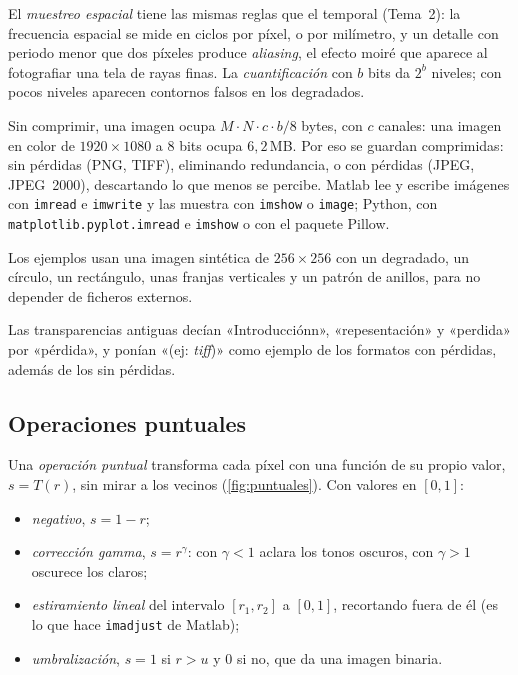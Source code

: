 \documentclass[11pt,a4paper]{scrartcl}
\begin{document}
El \emph{muestreo espacial} tiene las mismas reglas que el temporal (Tema~2): la frecuencia espacial se mide en ciclos por píxel, o por milímetro, y un detalle con periodo menor que dos píxeles produce \emph{aliasing}, el efecto moiré que aparece al fotografiar una tela de rayas finas. La \emph{cuantificación} con $b$ bits da $2^b$ niveles; con pocos niveles aparecen contornos falsos en los degradados.

Sin comprimir, una imagen ocupa $M\cdot N\cdot c\cdot b/8$ bytes, con $c$ canales: una imagen en color de $1920\times1080$ a 8 bits ocupa $6{,}2$\,MB. Por eso se guardan comprimidas: sin pérdidas (PNG, TIFF), eliminando redundancia, o con pérdidas (JPEG, JPEG~2000), descartando lo que menos se percibe. Matlab lee y escribe imágenes con \texttt{imread} e \texttt{imwrite} y las muestra con \texttt{imshow} o \texttt{image}; Python, con \texttt{matplotlib.pyplot.imread} e \texttt{imshow} o con el paquete Pillow.

\begin{encodigo}
  Los ejemplos usan una imagen sintética de $256\times256$ con un degradado, un círculo, un rectángulo, unas franjas verticales y un patrón de anillos, para no depender de ficheros externos.
\end{encodigo}

\begin{errata}
  Las transparencias antiguas decían «Introducciónn», «repesentación» y «perdida» por «pérdida», y ponían «(ej: \emph{tiff})» como ejemplo de los formatos con pérdidas, además de los sin pérdidas.
\end{errata}

\subsection{Operaciones puntuales}

Una \emph{operación puntual} transforma cada píxel con una función de su propio valor, $s=T(r)$, sin mirar a los vecinos (\cref{fig:puntuales}). Con valores en $[0,1]$:
\begin{itemize}
  \item \emph{negativo}, $s=1-r$;
  \item \emph{corrección gamma}, $s=r^\gamma$: con $\gamma<1$ aclara los tonos oscuros, con $\gamma>1$ oscurece los claros;
  \item \emph{estiramiento lineal} del intervalo $[r_1,r_2]$ a $[0,1]$, recortando fuera de él (es lo que hace \texttt{imadjust} de Matlab);
  \item \emph{umbralización}, $s=1$ si $r>u$ y 0 si no, que da una imagen binaria.
\end{itemize}
\end{document}

